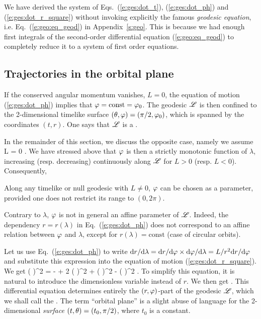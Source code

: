 \begin{remark}
We have derived the system of Eqs.~(\ref{e:ges:dot_t}), (\ref{e:ges:dot_ph}) and (\ref{e:ges:dot_r_square}) without invoking explicitly the
famous \emph{geodesic equation}, i.e.
Eq.~(\ref{e:geo:eq_geod}) in Appendix~\ref{s:geo}.
This is because we had enough
first integrals of the second-order differential equation
(\ref{e:geo:eq_geod})
to completely reduce it to
a system of first order equations.
\end{remark}

\subsection{Trajectories in the orbital plane} \label{s:ges:trajectories}

If the conserved angular momentum vanishes, $L=0$, the equation of motion
(\ref{e:ges:dot_ph}) implies that $\varphi = \mathrm{const} = \varphi_0$. The geodesic
$\mathscr{L}$ is then confined to the 2-dimensional timelike surface
$(\theta, \varphi) = (\pi/2,\varphi_0)$, which is spanned by the coordinates $(t, r)$.
One says that $\mathscr{L}$ is a .

In the remainder of this section, we discuss the opposite case, namely we
assume
\be
    L \not = 0 .
\ee
We have stressed above that $\varphi$ is then a strictly monotonic function of $\lambda$,
increasing (resp. decreasing) continuously along $\mathscr{L}$ for $L>0$ (resp. $L<0$).
Consequently,
\begin{prop}
Along any timelike or null geodesic with $L\not =0$,
$\varphi$ can be chosen as a parameter, provided one does not restrict its
range to $(0,2\pi)$.
\end{prop}
Contrary to $\lambda$, $\varphi$ is not in general an affine parameter of $\mathscr{L}$.
Indeed, the dependency $r = r(\lambda)$ in Eq.~(\ref{e:ges:dot_ph})
does not correspond to an affine relation between $\varphi$ and $\lambda$, except for
$r(\lambda) = \mathrm{const}$ (case of circular orbits).

Let us use Eq.~(\ref{e:ges:dot_ph}) to write
$\mathrm{d} r/ \mathrm{d}\lambda = \mathrm{d} r/\mathrm{d}\varphi \times \mathrm{d}\varphi/\mathrm{d}\lambda = L/r^2 \mathrm{d} r /\mathrm{d}\varphi$
and substitute this expression into the equation of motion
(\ref{e:ges:dot_r_square}). We get
\be
     \left(  \right)^2 =
      -  + 2  \left(  \right)^2 
     + \left(  \right)^2 - \left(  \right)^2 .
\ee
To simplify this equation, it is natural to introduce the dimensionless variable
\be \label{e:ges:def_u}
\ee
instead of $r$. We then get
\be \label{e:ges:DuDph_trajectories}
    .
\ee
This differential equation determines entirely the $(r,\varphi)$-part of the geodesic $\mathscr{L}$,
which we shall call the
.
The term ``orbital plane'' is a slight abuse of language for
the 2-dimensional \emph{surface} $(t,\theta) = (t_0, \pi/2)$, where $t_0$ is a constant.

